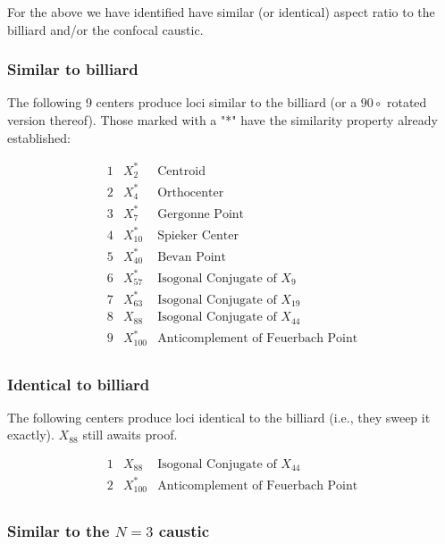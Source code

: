 \documentclass[]{article}
\begin{document}
For the above we have identified have similar (or identical) aspect ratio to the billiard and/or the confocal caustic.

\hypertarget{similar-to-billiard}{%
\subsubsection{Similar to billiard}\label{similar-to-billiard}}

The following 9 centers produce loci similar to the billiard (or a \(90\circ\) rotated version thereof). Those marked with a "*" have the similarity property already established:

\[
\begin{array}{cll}
 1 & X_{2}^* & \text{Centroid} \\
 2 & X_{4}^* & \text{Orthocenter} \\
 3 & X_{7}^* & \text{Gergonne Point} \\
 4 & X_{10}^* & \text{Spieker Center} \\
 5 & X_{40}^* & \text{Bevan Point} \\
 6 & X_{57}^* & \text{Isogonal Conjugate of $X_{9}$} \\
 7 & X_{63}^* & \text{Isogonal Conjugate of $X_{19}$} \\
 8 & X_{88} & \text{Isogonal Conjugate of $X_{44}$} \\
 9 & X_{100}^* & \text{Anticomplement of Feuerbach Point} \\
\end{array}
\]

\hypertarget{identical-to-billiard}{%
\subsubsection{Identical to billiard}\label{identical-to-billiard}}

The following centers produce loci identical to the billiard (i.e., they sweep it exactly). \(X_{88}\) still awaits proof.

\[
\begin{array}{cll}
 1 & X_{88} & \text{Isogonal Conjugate of $X_{44}$} \\
 2 & X_{100}^* & \text{Anticomplement of Feuerbach Point} \\
\end{array}
\]

\hypertarget{similar-to-the-n3-caustic}{%
\subsubsection{\texorpdfstring{Similar to the \(N=3\) caustic}{Similar to the N=3 caustic}}\label{similar-to-the-n3-caustic}}
\end{document}
